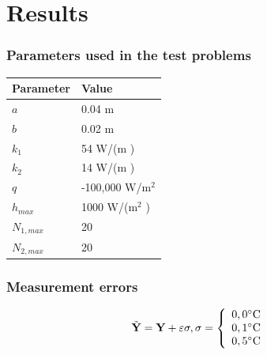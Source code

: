 \documentclass{beamer}
\begin{document}
\section{Results}
\begin{frame}
	\frametitle{Parameters used in the test problems}
	\begin{table}[H]
		\centering
		\begin{tabular}{|l|l|}
			\hline
			\textbf{Parameter} & \textbf{Value}  \\ \hline
			$a$       & 0.04 m   \\ \hline
			$b$       & 0.02 m     \\ \hline
			$k_1$     & 54 W/(m \celsius)  \\ \hline
			$k_2$     & 14 W/(m \celsius) \\ \hline
			$q$       & -100,000 W/$\text{m}^2$ \\ \hline
			$h_{max}$       & 1000 W/($\text{m}^2$ \celsius) \\ \hline
			$N_{1,max}$       & 20 \\ \hline
			$N_{2,max}$       & 20 \\ \hline
		\end{tabular}		
		\label{tabela_params}
	\end{table}
\end{frame}
%

%
\begin{frame}
	\frametitle{Measurement errors}
	\begin{center}
		\begin{align*}
		& \tilde{\mathbf{Y}} = \mathbf{Y} + \mathbf{\varepsilon} \sigma, \sigma = 
		\left\lbrace \begin{array}{ll}
		0,0\celsius \\
		0,1\celsius \\
		0,5\celsius
		\end{array}\right .
		\end{align*}
	\end{center}
\end{frame}


%

%
\end{document}
